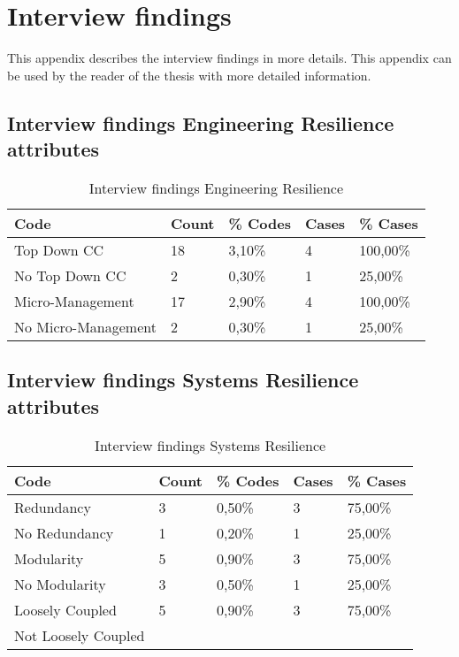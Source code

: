 \chapter{Interview findings}
\label{app:interviewfindings}
This appendix describes the interview findings in more details. This appendix can be used by the reader of the thesis with more detailed information.

\section{Interview findings Engineering Resilience attributes}
\label{sec:interviewsresultsengineeringresilience}
\begin{table}[H]
	\centering
	\begin{tabular}{lllll}
		\toprule
		\textbf{Code} & \multicolumn{1}{l}{\textbf{Count}} & \multicolumn{1}{l}{\textbf{\% Codes}} & \multicolumn{1}{l}{\textbf{Cases}} & \multicolumn{1}{l}{\textbf{\% Cases}} \\
		\midrule
		Top Down CC &  18    & 3,10\% & 4     & 100,00\% \\
		No Top Down CC & 2     & 0,30\% & 1     & 25,00\% \\
		Micro-Management & 17    & 2,90\% & 4     & 100,00\% \\
		No Micro-Management & 2     & 0,30\% & 1     & 25,00\% \\
		\bottomrule
	\end{tabular}%
	\caption{Interview findings Engineering Resilience}
	\label{tab:interviewresultsengineeringresilience}%
\end{table}%

\section{Interview findings Systems Resilience attributes}
\label{sec:interviewresultssystemsresilience}
\begin{table}[H]
	\centering
	\begin{tabular}{lllll}
		\toprule
		\textbf{Code} & \textbf{Count} & \textbf{\% Codes} &\textbf{Cases} & \textbf{\% Cases} \\
		\midrule
		Redundancy & 3     & 0,50\% & 3     & 75,00\% \\
		No Redundancy & 1     & 0,20\% & 1     & 25,00\% \\
		Modularity & 5     & 0,90\% & 3     & 75,00\% \\
		No Modularity & 3     & 0,50\% & 1     & 25,00\% \\
		Loosely Coupled & 5     & 0,90\% & 3     & 75,00\% \\
		Not Loosely Coupled  &       &       &       &  \\
		\bottomrule
	\end{tabular}%
		\caption{Interview findings Systems Resilience}%
		\label{tab:interviewresultsSystemsResilience}%
\end{table}%

